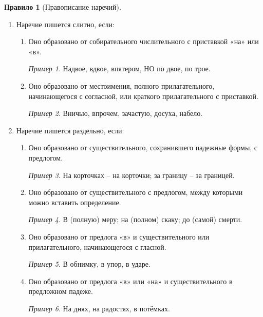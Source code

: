 \documentclass[12pt]{article}
\theoremstyle{definition}
\newtheorem{rrule}{Правило}[section]
\theoremstyle{remark}
\newtheorem*{example}{Пример}
\begin{document}
\begin{rrule}[Правописание наречий]
    \hfill 
    \begin{enumerate}
        \item Наречие пишется слитно, если:
        \begin{enumerate}
            \item Оно образовано от собирательного числительного с приставкой «на» или «в».
            \begin{example}
                Надвое, вдвое, впятером, НО по двое, по трое.
            \end{example}
            \item Оно образовано от местоимения, полного прилагательного, начинающегося с согласной, или краткого прилагательного с приставкой.
            \begin{example}
                Вничью, впрочем, зачастую, досуха, набело.
            \end{example}
        \end{enumerate}
        \item Наречие пишется раздельно, если:
        \begin{enumerate}
            \item Оно образовано от существительного, сохранившего падежные формы, с предлогом.
            \begin{example}
                На корточках -- на корточки; за границу -- за границей.
            \end{example}
            \item Оно образовано от существительного с предлогом, между которыми можно вставить определение.
            \begin{example}
                В (полную) меру; на (полном) скаку; до (самой) смерти.
            \end{example}
            \item Оно образовано от предлога «в» и существительного или прилагательного, начинающегося с гласной.
            \begin{example}
                В обнимку, в упор, в ударе.
            \end{example}
            \item Оно образовано от предлога «в» или «на» и существительного в предложном падеже.
            \begin{example}
                На днях, на радостях, в потёмках.
            \end{example} 
        \end{enumerate}

\end{enumerate}
\end{rrule}
\end{document}
